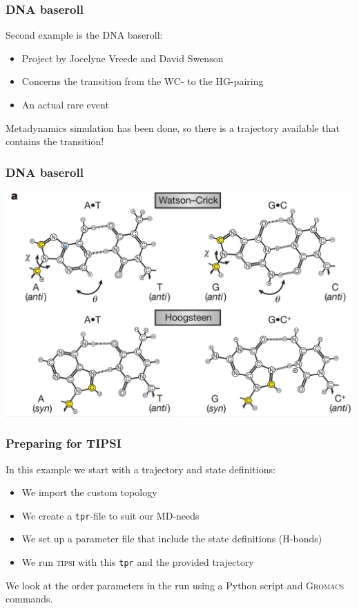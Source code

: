 \documentclass[hyperref={pdfpagelabels=false}]{beamer}
\begin{document}

\begin{frame}
\frametitle{DNA baseroll} 
Second example is the DNA baseroll:
\begin{itemize}
\item Project by Jocelyne Vreede and David Swenson
\item Concerns the transition from the WC- to the HG-pairing
\item An actual rare event
\end{itemize}
Metadynamics simulation has been done, so there is a trajectory available that contains the transition!
\end{frame}

\begin{frame}
\frametitle{DNA baseroll} 
\begin{center}
\includegraphics[scale=0.2]{images/pairing.png}
\end{center}
\end{frame}

\begin{frame}
\frametitle{Preparing for \textsc{TIPSI}} 
In this example we start with a trajectory and state definitions:
\begin{itemize}
\item We import the custom topology
\item We create a \texttt{tpr}-file to suit our MD-needs
\item We set up a parameter file that include the state definitions (H-bonds)
\item We run \textsc{tipsi} with this \texttt{tpr} and the provided trajectory
\end{itemize}
We look at the order parameters in the run using a Python script and \textsc{Gromacs} commands.
\end{frame}
\end{document}
